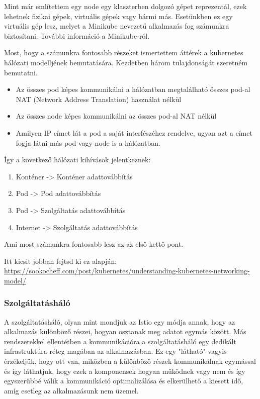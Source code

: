 \documentclass[a4paper,oneside]{article}
\begin{document}
Mint már említettem egy node egy klaszterben dolgozó gépet reprezentál, ezek 
lehetnek fizikai gépek, virtuális gépek vagy bármi más. Esetünkben ez egy 
virtuális gép lesz, melyet a Minikube nevezetű alkalmazás fog számunkra biztosítani. 
További információ a Minikube-ról. ~\cite{minikube}

Most, hogy a számunkra fontosabb részeket ismertettem áttérek a kubernetes 
hálózati modelljének bemutatására. Kezdetben három tulajdonságát szeretném 
bemutatni. 
\begin{itemize}
	\item Az összes pod képes kommunikálni a hálózatban megtalálható összes 
	pod-al NAT (Network Address Translation) használat nélkül 
	\item Az összes node képes kommunikálni az összes pod-al NAT nélkül 
	\item Amilyen IP címet lát a pod a saját interfészéhez rendelve, ugyan 
	azt a címet fogja látni más pod vagy node is a hálózatban. 
\end{itemize}
Így a következő hálózati kihívások jelentkeznek: 
\begin{enumerate}
	\item Konténer -> Konténer adattovábbítás 
	\item Pod -> Pod adattovábbítás 
	\item Pod -> Szolgáltatás adattovábbítás 
	\item Internet -> Szolgáltatás adattovábbítás 
\end{enumerate}
Ami most számunkra fontosabb lesz az az első kettő pont. 

Itt kicsit jobban fejtsd ki ez alapján: \\
\url{https://sookocheff.com/post/kubernetes/understanding-kubernetes-networking-model/} 

\subsubsection{Szolgáltatásháló}
A szolgáltatásháló, olyan mint mondjuk az Istio egy módja annak, hogy az 
alkalmazás különböző részei, hogyan osztanak meg adatot egymás között. 
Más rendszerekkel ellentétben a kommunikációra a szolgáltatásháló egy 
dedikált infrastruktúra réteg magában az alkalmazásban. Ez egy "látható" 
vagyis érzékeljük, hogy ott van, miközben a különböző részek kommunikálnak 
egymással és így láthatjuk, hogy ezek a komponensek hogyan működnek vagy 
nem és így egyszerűbbé válik a kommunikáció optimalizálása és elkerülhető 
a kiesett idő, amíg esetleg az alkalmazásunk nem üzemel. 
\end{document}

